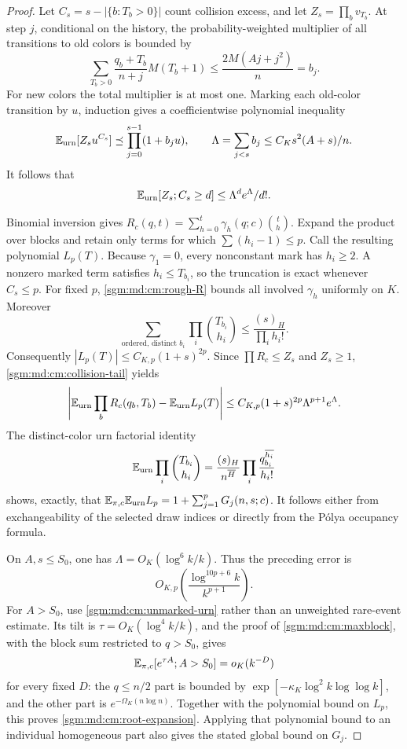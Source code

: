 \documentclass[11pt,letterpaper]{article}
\theoremstyle{remark}\newtheorem{remark}[theorem]{Remark}
\newcommand{\fall}[2]{(#1)_{#2}}\newcommand{\rise}[2]{#1^{\overline{#2}}}
\theoremstyle{definition}\newtheorem{definition}[theorem]{Definition}
\begin{document}
\begin{proof}
Let \(C_s=s-|\{b:T_b>0\}|\) count collision excess, and let
\(Z_s=\prod_bv_{T_b}\). At step \(j\), conditional on the history,
the probability-weighted multiplier of all transitions to old
colors is bounded by
\[
 \sum_{T_b>0}\frac{q_b+T_b}{n+j}M(T_b+1)
 \le\frac{2M(Aj+j^2)}{n}=b_j.
\]
For new colors the total multiplier is at most one.
Marking each old-color transition by \(u\), induction gives a
coefficientwise polynomial inequality
\[
 \mathbb E_{\rm urn}[Z_su^{C_s}]
 \preceq\prod_{j=0}^{s-1}(1+b_ju),\qquad
 \Lambda=\sum_{j<s}b_j\le C_Ks^2(A+s)/n.
\]
It follows that
\begin{equation}\label{sgm:md:cm:collision-tail}
 \mathbb E_{\rm urn}[Z_s;C_s\ge d]\le\Lambda^de^\Lambda/d!.
\end{equation}

Binomial inversion gives
\(R_c(q,t)=\sum_{h=0}^t\gamma_h(q;c)\binom th\).
Expand the product over blocks and retain only terms for which
\(\sum(h_i-1)\le p\). Call the resulting polynomial \(L_p(T)\).
Because \(\gamma_1=0\), every nonconstant mark has \(h_i\ge2\).
A nonzero marked term satisfies \(h_i\le T_{b_i}\), so the
truncation is exact whenever \(C_s\le p\).
For fixed \(p\), \eqref{sgm:md:cm:rough-R} bounds all involved
\(\gamma_h\) uniformly on \(K\). Moreover
\[
 \sum_{\text{ordered, distinct }b_i}
        \prod_i\binom{T_{b_i}}{h_i}
 \le\frac{\fall{s}{H}}{\prod_i h_i!}.
\]
Consequently \(|L_p(T)|\le C_{K,p}(1+s)^{2p}\).
Since \(\prod R_c\le Z_s\) and \(Z_s\ge1\),
\eqref{sgm:md:cm:collision-tail} yields
\[
 \left|\mathbb E_{\rm urn}\prod_bR_c(q_b,T_b)-\mathbb E_{\rm urn}L_p(T)\right|
 \le C_{K,p}(1+s)^{2p}\Lambda^{p+1}e^\Lambda .
\]
The distinct-color urn factorial identity
\[
 \E_{\rm urn}\prod_i\binom{T_{b_i}}{h_i}
 =\frac{\fall{s}{H}}{\rise{n}{H}}
                  \prod_i\frac{\rise{q_{b_i}}{h_i}}{h_i!}
\]
shows, exactly, that
\(\mathbb E_{\pi,c}\mathbb E_{\rm urn}L_p=1+\sum_{j=1}^pG_j(n,s;c)\).
It follows either from exchangeability of the selected draw
indices or directly from the P\'olya occupancy formula.

On \(A,s\le S_0\), one has
\(\Lambda=O_K(\log^6k/k)\). Thus the preceding error is
\[
 O_{K,p}\!\left(\frac{\log^{10p+6}k}{k^{p+1}}\right).
\]
For \(A>S_0\), use \eqref{sgm:md:cm:unmarked-urn} rather than an
unweighted rare-event estimate. Its tilt is
\(\tau=O_K(\log^4k/k)\), and the proof of
\eqref{sgm:md:cm:maxblock}, with the block sum restricted to \(q>S_0\),
gives
\[
 \mathbb E_{\pi,c}[e^{\tau A};A>S_0]=o_K(k^{-D})
\]
for every fixed \(D\): the \(q\le n/2\) part is bounded by
\(\exp[-\kappa_K\log^2k\log\log k]\), and the other part is
\(e^{-\Omega_K(n\log n)}\).
Together with the polynomial bound on \(L_p\), this proves
\eqref{sgm:md:cm:root-expansion}. Applying that polynomial bound
to an individual homogeneous part also gives the stated global
bound on \(G_j\).
\end{proof}
\end{document}
